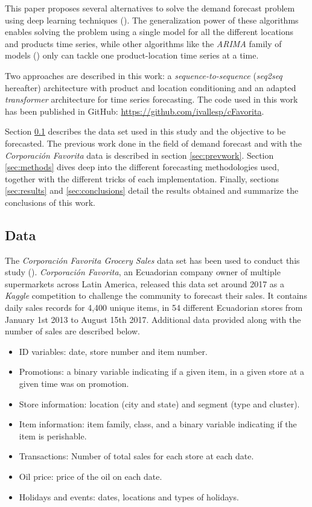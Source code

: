 This paper proposes several alternatives to solve the demand forecast problem using deep learning techniques (\cite{Goodfellow2016}). The generalization power of these algorithms enables solving the problem using a single model for all the different locations and products time series, while other algorithms like the \textit{ARIMA} family of models (\cite{Hyndman2018}) only can tackle one product-location time series at a time. 

Two approaches are described in this work: a \textit{sequence-to-sequence} (\textit{seq2seq} hereafter) architecture with product and location conditioning and an adapted \textit{transformer} architecture for time series forecasting. The code used in this work has been published in GitHub: \url{https://github.com/ivallesp/cFavorita}.

Section \ref{sec:data} describes the data set used in this study and the objective to be forecasted. The previous work done in the field of demand forecast and with the \textit{Corporación Favorita} data is described in section \ref{sec:prevwork}. Section \ref{sec:methods} dives deep into the different forecasting methodologies used, together with the different tricks of each implementation. 
Finally, sections \ref{sec:results} and \ref{sec:conclusions} detail the results obtained and summarize the conclusions of this work.


\subsection{Data} \label{sec:data}
The \textit{Corporación Favorita Grocery Sales} data set  has been used to conduct this study (\cite{corporacionfavoritadataset2018}). \textit{Corporación Favorita}, an Ecuadorian company owner of multiple supermarkets across Latin America, released this data set around 2017 as a \textit{Kaggle} competition to challenge the community to forecast their sales. It contains daily sales records for 4,400 unique items, in 54 different Ecuadorian stores from January 1st 2013 to August 15th 2017. Additional data provided along with the number of sales are described below.

\begin{itemize}
	\item ID variables: date, store number and item number.
	\item Promotions: a binary variable indicating if a given item, in a given store at a given time was on promotion.
	\item Store information: location (city and state) and segment (type and cluster).
	\item Item information: item family, class, and a binary variable indicating if the item is perishable.
	\item Transactions: Number of total sales for each store at each date.
	\item Oil price: price of the oil on each date.
	\item Holidays and events: dates, locations and types of holidays.
\end{itemize}

